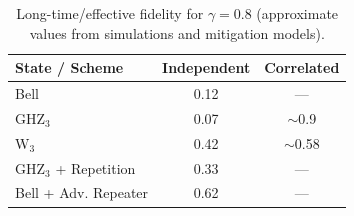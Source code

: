 \begin{table}[ht]
\caption{Long-time/effective fidelity for $\gamma=0.8$ (approximate values from simulations and mitigation models).}
\begin{ruledtabular}
\begin{tabular}{lcc}
State / Scheme          & Independent & Correlated \\
\hline
Bell                    & 0.12        & ---        \\
GHZ$_3$                 & 0.07        & $\sim$0.9  \\
W$_3$                   & 0.42        & $\sim$0.58 \\
GHZ$_3$ + Repetition    & 0.33        & ---        \\
Bell + Adv. Repeater    & 0.62        & ---        \\
\end{tabular}
\end{ruledtabular}
\label{tab:fidelity}
\end{table}
